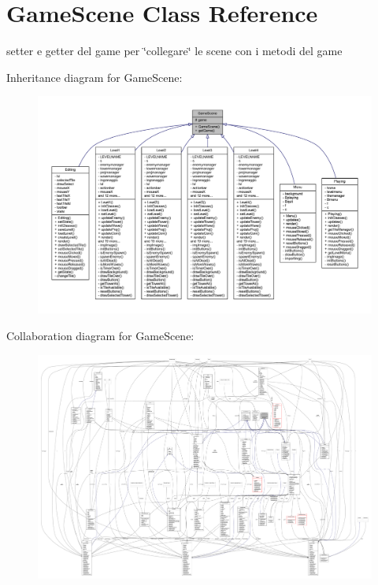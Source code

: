 \hypertarget{classscenes_1_1_game_scene}{}\section{Game\+Scene Class Reference}
\label{classscenes_1_1_game_scene}


setter e getter del game per \char`\"{}collegare\char`\"{} le scene con i metodi del game  




Inheritance diagram for Game\+Scene\+:
\nopagebreak
\begin{figure}[H]
\begin{center}
\leavevmode
\includegraphics[width=350pt]{classscenes_1_1_game_scene__inherit__graph}
\end{center}
\end{figure}


Collaboration diagram for Game\+Scene\+:
\nopagebreak
\begin{figure}[H]
\begin{center}
\leavevmode
\includegraphics[width=350pt]{classscenes_1_1_game_scene__coll__graph}
\end{center}
\end{figure}
